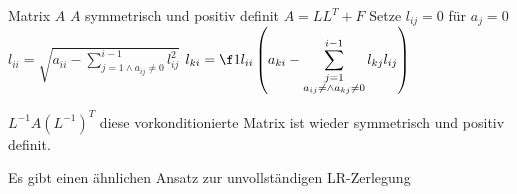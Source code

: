 \documentclass{mycourse}
\begin{document}
\begin{alg}
	\label{alg:6.6}
	\begin{algorithmic}
		\Input Matrix $A$
		\Assume $A$ symmetrisch und positiv definit
		\Output $A=LL^T + F$
		\Statex
		\State Setze $l_{ij} = 0$ für $a_{j}=0$
			\State $\displaystyle l_{ii} = \sqrt{a_{ii}-\sum_{j=1\land a_{ij}\neq 0}^{i-1}l_{ij}^2}$
				\State $\displaystyle l_{ki} = \f 1{l_{ii}} \left(a_{ki} - \sum_{\substack{j=1\\ a_{ij}\neq   \land a_{kj}\neq 0}}^{i-1}l_{kj}l_{ij}\right)$
			\EndFor
		\EndFor
	\end{algorithmic}
	$L^{-1}A(L^{-1})^T$ diese vorkonditionierte Matrix ist wieder symmetrisch und positiv definit.
	\begin{note}
		Es gibt einen ähnlichen Ansatz zur unvollständigen LR-Zerlegung
	\end{note}
\end{alg}
\end{document}
